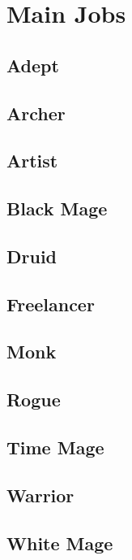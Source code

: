 \section{Main Jobs}\label{sec:jobs-pjob}
\subsection{Adept}

\subsection{Archer}\label{subsec:pjob-archer}

\subsection{Artist}\label{subsec:pjob-artist}

\subsection{Black Mage}\label{subsec:pjob-blackmage}

\subsection{Druid}\label{subsec:pjob-druid}

\subsection{Freelancer}\label{subsec:pjob-freelancer}

\subsection{Monk}\label{subsec:pjob-monk}

\subsection{Rogue}\label{subsec:pjob-rogue}

\subsection{Time Mage}\label{subsec:pjob-timemage}

\subsection{Warrior}\label{subsec:pjob-warrior}

\subsection{White Mage}\label{subsec:pjob-whitemage}

